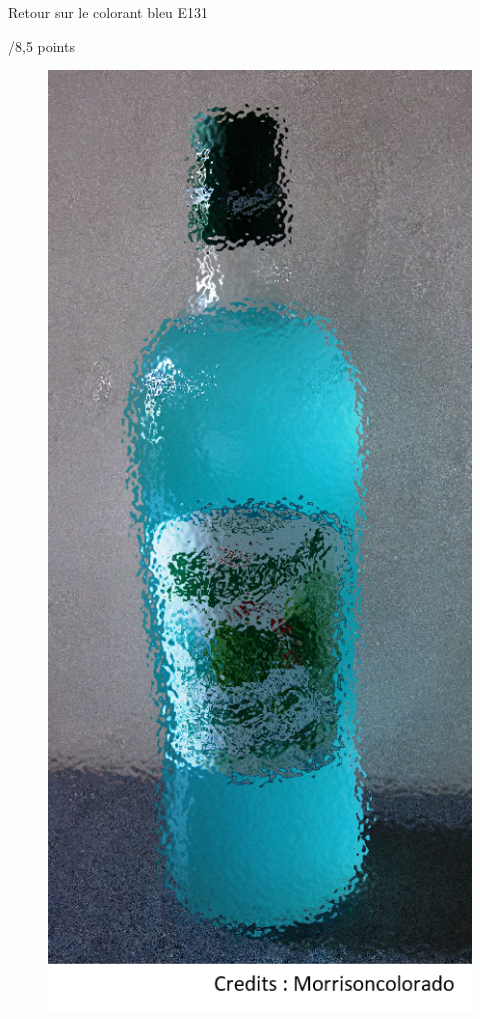 \begin{doc}{Retour sur le colorant bleu E131 \begin{Large}
    /8,5 points
\end{Large}}
\begin{figure}
\vspace{-1cm}
    \centering
      \includegraphics[scale=0.35]{Images/DS/DS2/Sirop_menthe.png}

\end{figure}
\end{doc}
